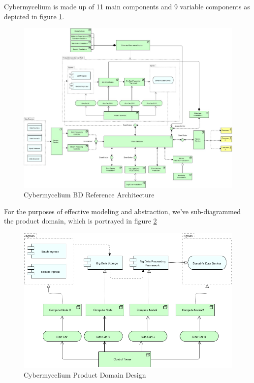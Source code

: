 \documentclass[review]{elsarticle}
\begin{document}
Cybermycelium is made up of 11 main components and 9 variable components as depicted in figure \ref{fig:Cybermycelium}.

\begin{figure}[h!]
    \centering
    \includegraphics[width=12cm]{Media/Cybermycelium.jpg}
    \caption{Cybermycelium BD Reference Architecture}
    \label{fig:Cybermycelium}
\end{figure}

For the purposes of effective modeling and abstraction, we've sub-diagrammed the product domain, which is portrayed in figure \ref{fig:Cybermycelium Product Domain Design}

\begin{figure}[h!]
    \centering
    \includegraphics[width=12cm]{Media/Product Domain.jpg}
    \caption{Cybermycelium Product Domain Design}
    \label{fig:Cybermycelium Product Domain Design}
\end{figure}
\end{document}

